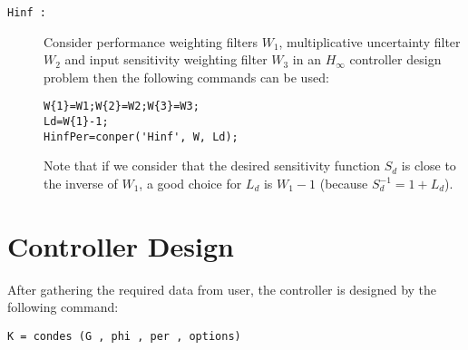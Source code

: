 \documentclass [12pt , a4paper] {report}
\begin{document}
\begin{description}
\item[{\tt Hinf :}] Consider performance weighting filters $W_1$, multiplicative uncertainty filter $W_2$ and input sensitivity weighting filter $W_3$ in an $H_\infty$ controller design problem then the following commands can be used:
\begin{lstlisting}
W{1}=W1;W{2}=W2;W{3}=W3;
Ld=W{1}-1;
HinfPer=conper('Hinf', W, Ld);
\end{lstlisting} 
Note that if we consider that the desired sensitivity function $S_d$ is close to the inverse of $W_1$, a good choice for $L_d$ is $W_1-1$ (because $S_d^{-1}=1+L_d$).

\end{description}



\section{Controller Design}
After gathering the required data from user, the controller is designed by the following command:

\begin{lstlisting}  
K = condes (G , phi , per , options)
\end{lstlisting}
\end{document}
